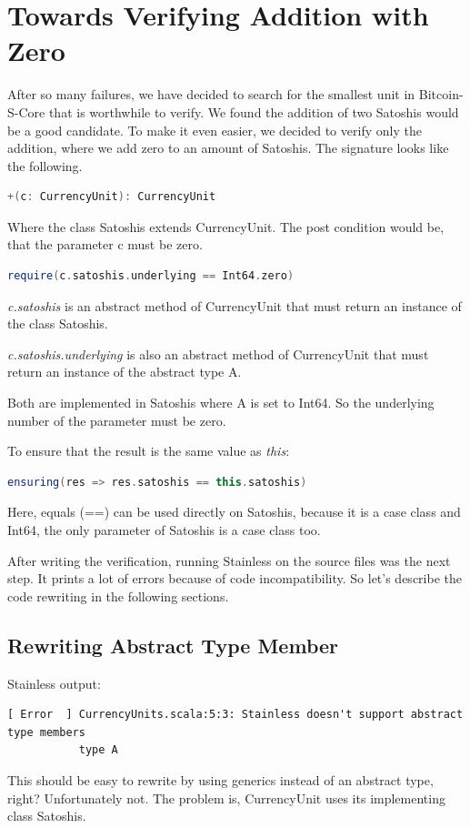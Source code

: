 \chapter{Towards Verifying Addition with Zero}
After so many failures, we have decided to search for the smallest unit in Bitcoin-S-Core that is worthwhile to verify.
We found the addition of two Satoshis would be a good candidate.
To make it even easier, we decided to verify only the addition, where we add zero to an amount of Satoshis.
The signature looks like the following.
\begin{lstlisting}[language=scala]
  +(c: CurrencyUnit): CurrencyUnit
\end{lstlisting}

Where the class Satoshis extends CurrencyUnit.
The post condition would be, that the parameter c must be zero.
\begin{lstlisting}[language=scala]
  require(c.satoshis.underlying == Int64.zero)
\end{lstlisting}

\emph{c.satoshis} is an abstract method of CurrencyUnit that must return an instance of the class Satoshis.

\emph{c.satoshis.underlying} is also an abstract method of CurrencyUnit that must return an instance of the abstract type A.

Both are implemented in Satoshis where A is set to Int64.
So the underlying number of the parameter must be zero.

To ensure that the result is the same value as \emph{this}:
\begin{lstlisting}[language=scala]
  ensuring(res => res.satoshis == this.satoshis)
\end{lstlisting}

Here, equals (==) can be used directly on Satoshis, because it is a case class and Int64, the only parameter of Satoshis is a case class too.

After writing the verification, running Stainless on the source files was the next step.
It prints a lot of errors because of code incompatibility.
So let's describe the code rewriting in the following sections.


\section{Rewriting Abstract Type Member}
Stainless output:
\begin{verbatim}
[ Error  ] CurrencyUnits.scala:5:3: Stainless doesn't support abstract type members
           type A
\end{verbatim}
This should be easy to rewrite by using generics instead of an abstract type, right?
Unfortunately not.
The problem is, CurrencyUnit uses its implementing class Satoshis.

